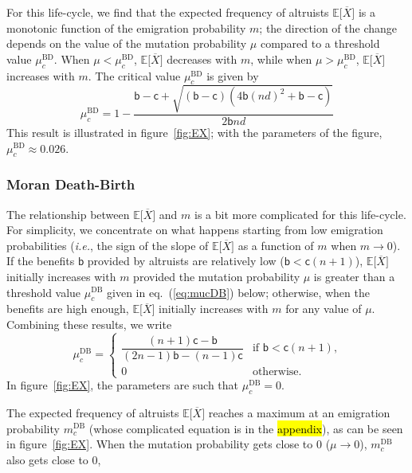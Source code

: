 \documentclass[11pt, letterpaper]{article}
\renewcommand{\eqref}[1]{\textup{{\normalfont eq.~(\ref{#1}}\normalfont)}}
\newcommand{\ie}{\textit{i.e.}}
\newcommand{\Esp}[1]{\mathbb{E}\big[ #1\big]}%
\newcommand{\bb}{\mathsf{b}}
\newcommand{\cc}{\mathsf{c}}
\newcommand{\BD}{\textrm{BD}}
\newcommand{\DB}{\textrm{DB}}
\begin{document}
For this life-cycle, we find that the expected frequency of altruists $\Esp{\overline{X}}$ is a monotonic function of the emigration probability $m$; the direction of the change depends on the value of the mutation probability $\mu$ compared to a threshold value $\mu_c^{\BD}$. When $\mu<\mu_c^{\BD}$, $\Esp{\overline{X}}$ decreases with $m$, while when $\mu>\mu_c^{\BD}$, $\Esp{\overline{X}}$  increases with $m$. The critical value $\mu_c^{\BD}$ is given by 
\begin{equation}\label{eq:mucBD}
\mu_c^{\BD} = %
1 - \frac{\bb  - \cc + \sqrt{(\bb - \cc) \left(4 \bb (n d)^2 + \bb - \cc \right)} }{2 \bb n d}
\end{equation}
%
This result is illustrated in figure~\ref{fig:EX}; with the parameters of the figure, $\mu_c^{\BD} \approx 0.026$.

\subsubsection{Moran Death-Birth}

The relationship between $\Esp{\overline{X}}$ and $m$ is a bit more complicated for this life-cycle. For simplicity, we concentrate on what happens starting from low emigration probabilities (\ie, the sign of the slope of $\Esp{\overline{X}}$ as a function of $m$ when $m\to 0$). If the benefits $\bb$ provided by altruists are relatively low ($\bb < \cc (n+1)$), $\Esp{\overline{X}}$ initially increases with $m$ provided the mutation probability $\mu$ is greater than a threshold value $\mu_c^{\DB}$ given in \eqref{eq:mucDB} below; otherwise, when the benefits are high enough, $\Esp{\overline{X}}$ initially increases with $m$ for any value of $\mu$. Combining these results, we write
\begin{equation}\label{eq:mucDB}
\mu_c^{\DB} = \begin{cases}
\dfrac{ (n+1) \cc - \bb}{ (2 n - 1) \bb - (n-1) \cc} & \textrm{if $\bb < \cc (n+1)$,} \\
%
0 & \textrm{otherwise. }
\end{cases}
\end{equation} 
%
In figure~\ref{fig:EX}, the parameters are such that $\mu_c^{\DB} = 0$. 

The expected frequency of altruists $\Esp{\overline{X}}$ reaches a maximum at an emigration probability $m_c^{\DB}$ (whose complicated equation is in the \hl{appendix}), as can be seen in figure~\ref{fig:EX}. When the mutation probability gets close to $0$ ($\mu \to 0$), $m_c^{\DB}$ also gets close to $0$, 
\end{document}

